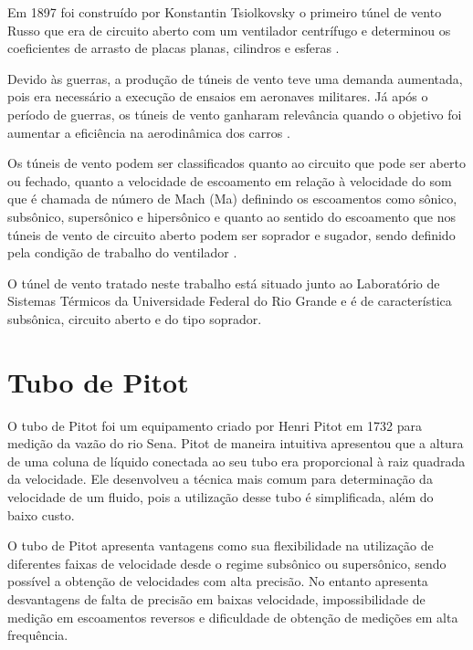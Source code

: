 Em 1897 foi construído por Konstantin Tsiolkovsky o primeiro túnel de vento Russo que era de circuito 
aberto com um ventilador centrífugo e determinou os coeficientes de arrasto de placas planas, cilindros 
e esferas \cite{joglekar2014design}. 

Devido às guerras, a produção de túneis de vento teve uma demanda aumentada, pois era necessário a execução 
de ensaios em aeronaves militares. Já após o período de guerras, os túneis de vento ganharam relevância 
quando o objetivo foi aumentar a eficiência na aerodinâmica dos carros \cite{de2014adalberto}. 

Os túneis de vento podem ser classificados quanto ao circuito que pode ser aberto ou fechado, quanto a velocidade 
de escoamento em relação à velocidade do som que é chamada de número de Mach (Ma) definindo os escoamentos como sônico, 
subsônico, supersônico e hipersônico e quanto ao sentido do escoamento que nos túneis de vento de circuito aberto podem 
ser soprador e sugador, sendo definido pela condição de trabalho do ventilador \cite{pritchard2005fox}.

O túnel de vento tratado neste trabalho está situado junto ao Laboratório de Sistemas Térmicos da Universidade Federal 
do Rio Grande e é de característica subsônica, circuito aberto e do tipo soprador.

\section{Tubo de Pitot}\label{sec:tubo}

O tubo de Pitot foi um equipamento criado por Henri Pitot em 1732 para medição da vazão do rio Sena. 
Pitot de maneira intuitiva apresentou que a altura de uma coluna de líquido conectada ao seu tubo era 
proporcional à raiz quadrada da velocidade. Ele desenvolveu a técnica mais comum para determinação 
da velocidade de um fluido, pois a utilização desse tubo é simplificada, além do baixo custo.

O tubo de Pitot apresenta vantagens como sua flexibilidade na utilização de diferentes faixas de velocidade 
desde o regime subsônico ou supersônico, sendo possível a obtenção de velocidades com alta precisão. 
No entanto apresenta desvantagens de falta de precisão em baixas velocidade, impossibilidade de medição 
em escoamentos reversos e dificuldade de obtenção de medições em alta frequência.

